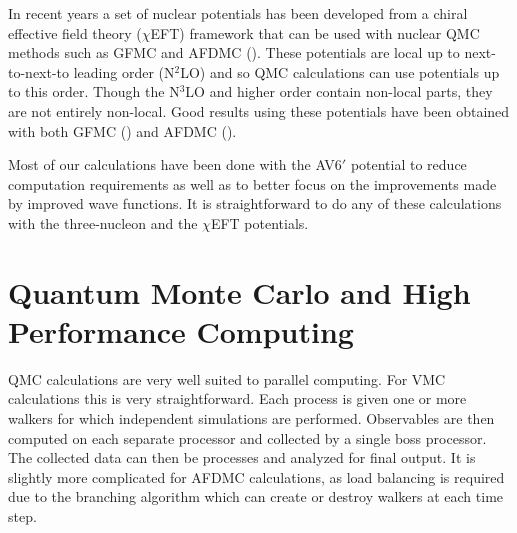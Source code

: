 In recent years a set of nuclear potentials has been developed from a chiral effective field theory ($\chi$EFT) framework that can be used with nuclear QMC methods such as GFMC and AFDMC (\cite{epelbaum2009,machleidt2011}). These potentials are local up to next-to-next-to leading order (N$^2$LO) and so QMC calculations can use potentials up to this order. Though the N$^3$LO and higher order contain non-local parts, they are not entirely non-local. Good results using these potentials have been obtained with both GFMC (\cite{lynn2014}) and AFDMC (\cite{lonardoni2018}).

Most of our calculations have been done with the AV6$'$ potential to reduce computation requirements as well as to better focus on the improvements made by improved wave functions. It is straightforward to do any of these calculations with the three-nucleon and the $\chi$EFT potentials.

\section{Quantum Monte Carlo and High Performance Computing}
QMC calculations are very well suited to parallel computing. For VMC calculations this is very straightforward. Each process is given one or more walkers for which independent simulations are performed. Observables are then computed on each separate processor and collected by a single boss processor. The collected data can then be processes and analyzed for final output. It is slightly more complicated for AFDMC calculations, as load balancing is required due to the branching algorithm which can create or destroy walkers at each time step.

